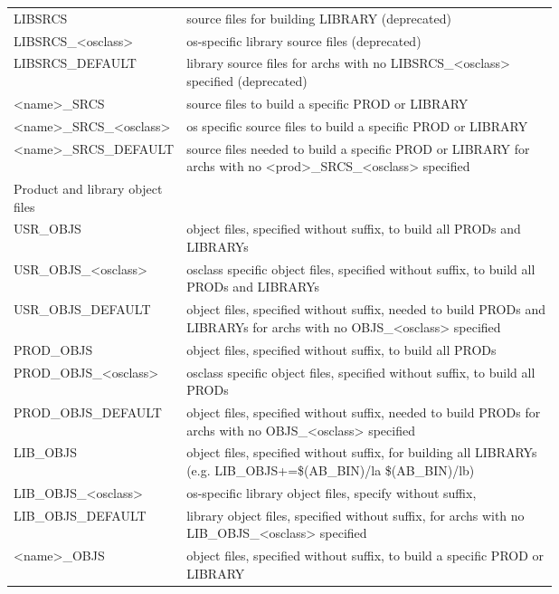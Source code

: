 \begin{center}
\begin{longtable}{lp{0.7\linewidth}}
LIBSRCS & source files for building LIBRARY (deprecated)\\
LIBSRCS\_\textless{}osclass\textgreater{} & os-specific library source files (deprecated)\\
LIBSRCS\_DEFAULT & library source files for archs with no LIBSRCS\_\textless{}osclass\textgreater{} specified (deprecated)\\
\textless{}name\textgreater{}\_SRCS & source files to build a specific PROD or LIBRARY\\
\textless{}name\textgreater{}\_SRCS\_\textless{}osclass\textgreater{} & os specific source files to build a specific PROD or LIBRARY\\
\textless{}name\textgreater{}\_SRCS\_DEFAULT & source files needed to build a specific PROD or LIBRARY for archs with no \textless{}prod\textgreater{}\_SRCS\_\textless{}osclass\textgreater{} specified\\
Product and library object files & \\
USR\_OBJS & object files, specified without suffix, to build all PRODs and LIBRARYs\\
USR\_OBJS\_\textless{}osclass\textgreater{} & osclass specific object files, specified without suffix, to build all PRODs and LIBRARYs\\
USR\_OBJS\_DEFAULT & object files, specified without suffix, needed to build PRODs and LIBRARYs for archs with no OBJS\_\textless{}osclass\textgreater{} specified\\
PROD\_OBJS & object files, specified without suffix, to build all PRODs\\
PROD\_OBJS\_\textless{}osclass\textgreater{} & osclass specific object files, specified without suffix, to build all PRODs\\
PROD\_OBJS\_DEFAULT & object files, specified without suffix, needed to build PRODs for archs with no OBJS\_\textless{}osclass\textgreater{} specified\\
LIB\_OBJS & object files, specified without suffix, for building all LIBRARYs (e.g. LIB\_OBJS+=\$(AB\_BIN)/la \$(AB\_BIN)/lb)\\
LIB\_OBJS\_\textless{}osclass\textgreater{} & os-specific library object files, specify without suffix,\\
LIB\_OBJS\_DEFAULT & library object files, specified without suffix, for archs with no LIB\_OBJS\_\textless{}osclass\textgreater{} specified\\
\textless{}name\textgreater{}\_OBJS & object files, specified without suffix, to build a specific PROD or LIBRARY\\

\end{longtable}
\end{center}
